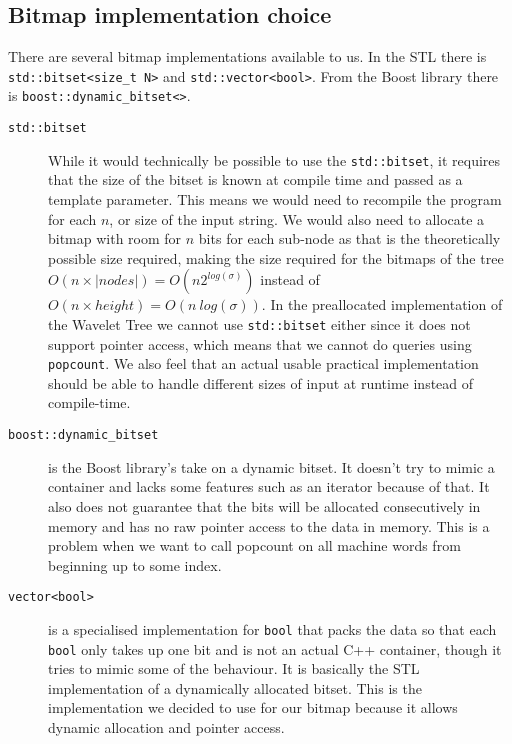 \subsection{Bitmap implementation choice}
There are several bitmap implementations available to us. In the STL there is \texttt{std::bitset<size\_t N>} and \texttt{std::vector<bool>}. From the Boost library there is \texttt{boost::dynamic\_bitset<>}.
\begin{description}
\item[\texttt{std::bitset}] While it would technically be possible to use the \texttt{std::bitset}, it requires that the size of the bitset is known at compile time and passed as a template parameter. This means we would need to recompile the program for each $n$, or size of the input string. 
We would also need to allocate a bitmap with room for $n$ bits for each sub-node as that is the theoretically possible size required, making the size required for the bitmaps of the tree $O(n \times |nodes|) = O(n2^{log(\sigma)})$ instead of $O(n \times height) = O(n~log(\sigma))$.
In the preallocated implementation of the Wavelet Tree we cannot use \texttt{std::bitset} either since it does not support pointer access, which means that we cannot do queries using \texttt{popcount}.
We also feel that an actual usable practical implementation should be able to handle different sizes of input at runtime instead of compile-time. 

\item[\texttt{boost::dynamic\_bitset}] is the Boost library's take on a dynamic bitset. 
It doesn't try to mimic a container and lacks some features such as an iterator because of that. 
It also does not guarantee that the bits will be allocated consecutively in memory and has no raw pointer access to the data in memory. 
This is a problem when we want to call popcount on all machine words from beginning up to some index.

\item[\texttt{vector<bool>}] is a specialised implementation for \texttt{bool} that packs the data so that each \texttt{bool} only takes up one bit and is not an actual C++ container, though it tries to mimic some of the behaviour. 
It is basically the STL implementation of a dynamically allocated bitset. This is the implementation we decided to use for our bitmap because it allows dynamic allocation and pointer access.
\end{description}

